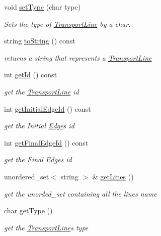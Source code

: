 \begin{DoxyCompactItemize}
void \hyperlink{class_transport_line_a18f279b7f0ed3b0bccbdffce4e38ad81}{set\+Type} (char type)
\begin{DoxyCompactList}\small\item\em Sets the type of \hyperlink{class_transport_line}{Transport\+Line} by a char. \end{DoxyCompactList}\item 
string \hyperlink{class_transport_line_a4ed5f0b15e7d9893bc24b68f81918b45}{to\+String} () const
\begin{DoxyCompactList}\small\item\em returns a string that represents a \hyperlink{class_transport_line}{Transport\+Line} \end{DoxyCompactList}\item 
int \hyperlink{class_transport_line_a54d4e0502f1ee731f474659ca0352dd5}{get\+Id} () const
\begin{DoxyCompactList}\small\item\em get the \hyperlink{class_transport_line}{Transport\+Line} id \end{DoxyCompactList}\item 
int \hyperlink{class_transport_line_a41824facb9ab92f3818b1b6d7ad89df5}{get\+Initial\+Edge\+Id} () const
\begin{DoxyCompactList}\small\item\em get the Initial \hyperlink{class_edge}{Edge}\textquotesingle{}s id \end{DoxyCompactList}\item 
int \hyperlink{class_transport_line_abc942221fba63b200afcf955769db7e0}{get\+Final\+Edge\+Id} () const
\begin{DoxyCompactList}\small\item\em get the Final \hyperlink{class_edge}{Edge}\textquotesingle{}s id \end{DoxyCompactList}\item 
unordered\+\_\+set$<$ string $>$ \& \hyperlink{class_transport_line_aef5df58c623344ea1d98b0f12fa2ca25}{get\+Lines} ()
\begin{DoxyCompactList}\small\item\em get the unorded\+\_\+set containing all the lines name \end{DoxyCompactList}\item 
char \hyperlink{class_transport_line_a0ef38c2c635d278c44aeb88ce6a68d31}{get\+Type} ()
\begin{DoxyCompactList}\small\item\em get the \hyperlink{class_transport_line}{Transport\+Line}\textquotesingle{}s type \end{DoxyCompactList}\item 

\end{DoxyCompactItemize}
